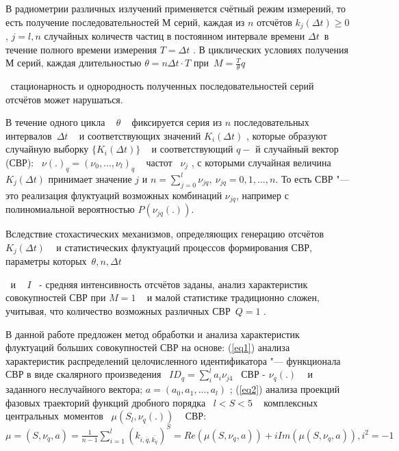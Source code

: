 
\vzmscaption
{ В радиометрии различных излучений применяется счётный режим
измерений, то есть получение последовательностей М серий, каждая из
$ n $    отсчётов  $k_{j} (\Delta t)\geqslant 0$
, $j=l,n$
  случайных количеств частиц в постоянном интервале времени }$\Delta t_{\,
}${   в течение полного времени измерения  }$T=\Delta t${ .   В
циклических условиях получения М серий, каждая длительностью  }$\theta
=n\Delta t\cdot T${    при~}$M=\frac{T}{\theta }q${ $_{~}${
стационарность и однородность полученных последовательностей серий отсчётов
может нарушаться.}

{ В течение одного
цикла ~ }${{\theta
}}${ ~ фиксируется серия из $n $ последовательных
интервалов~}$\Delta t${ ~ и соответствующих значений
}$K_{i}(\Delta t)${ , которые образуют случайную выборку $\{K_{i}(\Delta t)\}$
 ~ и соответствующий }{ $q-$}{ й случайный вектор
(СВР): ~}$\nu(.)_{q}=(\nu_{0},...,\nu_{l})_{q}${ ~ частот ~}$\nu_{j}${ , с
которыми случайная величина $K_{j}(\Delta t)$ принимает значение
 $j $ и }$n = \sum\limits_{j=0}^l \nu_{jq},~\nu_{jq}=0,1,...,n$.
То есть СВР "--- это реализация флуктуаций возможных комбинаций $\nu_{jq}$, например с полиномиальной
вероятностью $P(\nu_{jq}(.))$.

{ Вследствие стохастических механизмов, определяющих генерацию
отсчётов ~}$K_{j}(\Delta t)${ ~ и статистических флуктуаций процессов
формирования СВР, параметры которых~}$\theta,n,\Delta t${
$_{~}${ и ~}{ $I$}{~ - средняя интенсивность отсчётов заданы,
анализ характеристик совокупностей СВР при }$M=1${ ~ и
малой статистике традиционно сложен, учитывая, что количество возможных
различных СВР~}$Q=1${ .}

{ В данной работе предложен метод обработки и анализа характеристик
флуктуаций больших совокупностей СВР на основе: (\ref{eq1}) анализа характеристик
распределений целочисленного идентификатора "--- функционала СВР в виде
скалярного произведения ~}$ID_{q}=\sum\limits_{i}^l a_{i}\nu_{j4}${ ~СВР - }$\nu_{q}(.)${ ~ и заданного неслучайного вектора; }$a=(a_{0},a_{1},...,a_{l})${ ; (\ref{eq2}) анализа проекций фазовых траекторий функций дробного порядка ~}$l<S<5${ ~ комплексных
центральных~моментов ~}$\mu(S_{l},\nu_{q}(.))${ ~ СВР: \\
}$\mu=(S,\nu_{q},a)=\frac{1}{n-1} \sum\limits_{i=1}^l (k_{i,\bar{q},\bar{k_{q}}})^{S}=Re(\mu(S,\nu_{q},a))+iIm(\mu(S,\nu_{q},a)),i^{2}=-1${

}}}
